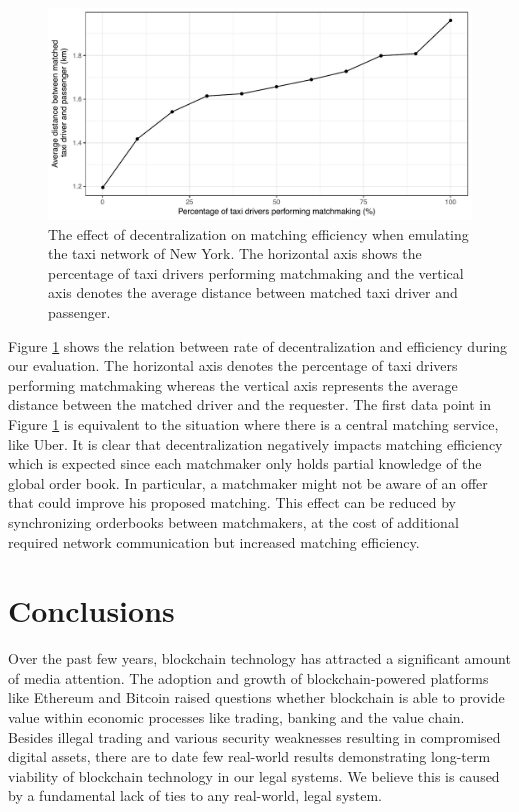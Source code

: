 \documentclass[USenglish]{article}
\begin{document}
\begin{figure}[t]
	\centering
	\includegraphics[width=0.8\columnwidth]{assets/matching_efficiency}
	\caption{The effect of decentralization on matching efficiency when emulating the taxi network of New York. The horizontal axis shows the percentage of taxi drivers performing matchmaking and the vertical axis denotes the average distance between matched taxi driver and passenger.}
	\label{fig:matching_efficiency}
\end{figure}

Figure \ref{fig:matching_efficiency} shows the relation between rate of decentralization and efficiency during our evaluation.
The horizontal axis denotes the percentage of taxi drivers performing matchmaking whereas the vertical axis represents the average distance between the matched driver and the requester.
The first data point in Figure \ref{fig:matching_efficiency} is equivalent to the situation where there is a central matching service, like Uber.
It is clear that decentralization negatively impacts matching efficiency which is expected since each matchmaker only holds partial knowledge of the global order book.
In particular, a matchmaker might not be aware of an offer that could improve his proposed matching.
This effect can be reduced by synchronizing orderbooks between matchmakers, at the cost of additional required network communication but increased matching efficiency.

\section{Conclusions}

Over the past few years, blockchain technology has attracted a significant amount of media attention.
The adoption and growth of blockchain-powered platforms like Ethereum and Bitcoin raised questions whether blockchain is able to provide value within economic processes like trading, banking and the value chain.
Besides illegal trading and various security weaknesses resulting in compromised digital assets, there are to date few real-world results demonstrating long-term viability of blockchain technology in our legal systems.
We believe this is caused by a fundamental lack of ties to any real-world, legal system.
\end{document}
